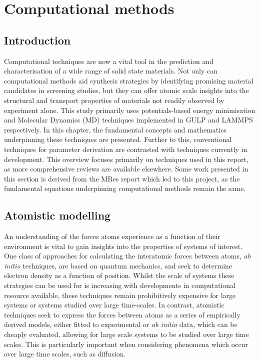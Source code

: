 \chapter{Computational methods}
\section{Introduction}
Computational techniques are now a vital tool in the prediction and characterisation of a wide range of solid state materials.
Not only can computational methods aid synthesis strategies by identifying promising material candidates in screening studies, but they can offer atomic scale insights into the structural and transport properties of materials not readily observed by experiment alone.
This study primarily uses potentials-based energy minimisation and Molecular Dynamics (MD)  techniques implemented in GULP \cite{Gale2003} and LAMMPS \cite{StevePlimton1995} respectively.
In this chapter, the fundamental concepts and mathematics underpinning these techniques are presented.
Further to this, conventional techniques for parameter derivation are contrasted with techniques currently in development.
This overview focuses primarily on techniques used in this report, as more comprehensive reviews are available elsewhere. \cite{Gale2003, Jensen2007, Catlow2013}
Some work presented in this section is derived from the MRes report which led to this project, as the fundamental equations underpinning computational methods remain the same.

\section{Atomistic modelling}
An understanding of the forces atoms experience as a function of their environment is vital to gain insights into the properties of systems of interest.
One class of approaches for calculating the interatomic forces between atoms, \textit{ab initio} techniques, are based on quantum mechanics, and seek to determine electron density as a function of position. Whilst the scale of systems these strategies can be used for is increasing with developments in computational resource available, these techniques remain prohibitively expensive for large systems or systems studied over large time-scales.
In contrast, atomistic techniques seek to express the forces between atoms as a series of empirically derived models, either fitted to experimental or \textit{ab initio} data, which can be cheaply evaluated, allowing for large scale systems to be studied over large time scales. 
This is particularly important when considering phenomena which occur over large time scales, such as diffusion. 

